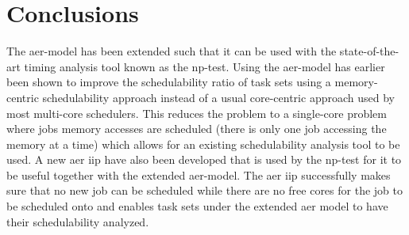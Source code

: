 \documentclass{kththesis}
\begin{document}










\section{Conclusions}

The \acrshort{aer}-model has been extended such that it can be used with the state-of-the-art
timing analysis tool known as the \acrshort{np}-test. Using the \acrshort{aer}-model has earlier
been shown to improve the schedulability ratio of task sets using a memory-centric schedulability
approach instead of a usual core-centric approach used by most multi-core schedulers. This reduces
the problem to a single-core problem where jobs memory accesses are scheduled (there is only one job
accessing the memory at a time) which allows for an existing schedulability analysis tool to be
used. A new \acrshort{aer} \acrshort{iip} have also been developed that is used by the
\acrshort{np}-test for it
to be useful together with the extended \acrshort{aer}-model. The \acrshort{aer} \acrshort{iip} successfully
makes sure that no new job can be scheduled while there are no free cores for the job to be
scheduled onto and enables task sets under the extended \acrshort{aer} model to have their
schedulability analyzed. 
\end{document}
